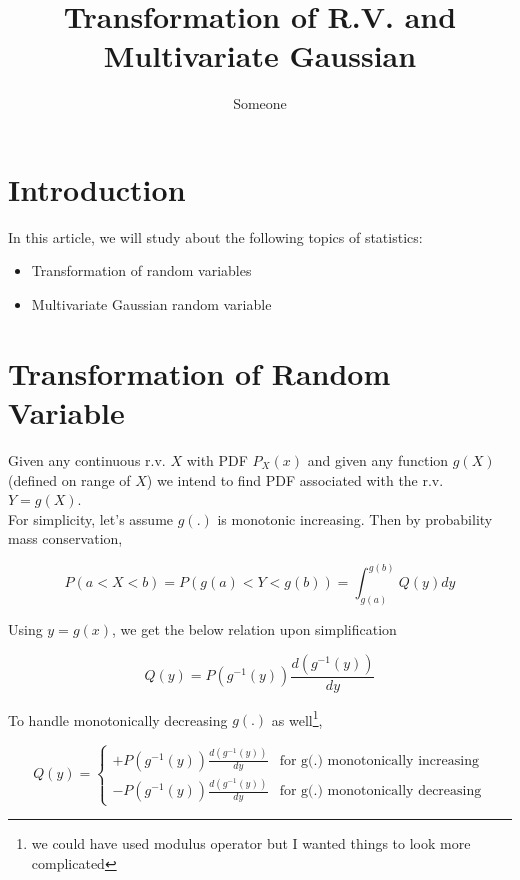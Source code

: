 \documentclass{article}
\begin{document}
\fancyhf[HL]{}
\fancyhf[HR]{}


\title{Transformation of R.V. and Multivariate Gaussian}
\author{Someone}
\maketitle

\tableofcontents
\clearpage
{}
\section{Introduction}
In this article, we will study about the following topics of statistics:
\begin{itemize}
    \item Transformation of random variables
    \item Multivariate Gaussian random variable
\end{itemize}

\section{Transformation of Random Variable}
Given any continuous r.v. $X$ with PDF $P_{X}(x)$ and given any function $g(X)$(defined on range of $X$)
 we intend to find PDF associated with the r.v. $Y = g(X)$.
\\ For simplicity, let's assume $g(.)$ is monotonic increasing.
Then by probability mass conservation,

\[P(a<X<b)=P(g(a)<Y<g(b))=\int_{g(a)}^{g(b)} Q(y)dy\]

Using $y = g(x)$, we get the below relation upon simplification

\[Q(y)=P(g^{-1}(y))\frac{d(g^{-1}(y))}{dy}\]

To handle monotonically decreasing $g(.)$ as well\footnote[1]{we could have used modulus operator but I wanted things to look more complicated},

\begin{equation}
    Q(y)=\begin{cases}
        +P(g^{-1}(y))\frac{d(g^{-1}(y))}{dy} & \text{for g(.) monotonically increasing}
        \\-P(g^{-1}(y))\frac{d(g^{-1}(y))}{dy} & \text{for g(.) monotonically decreasing}
    \end{cases}
\end{equation}
\end{document}
